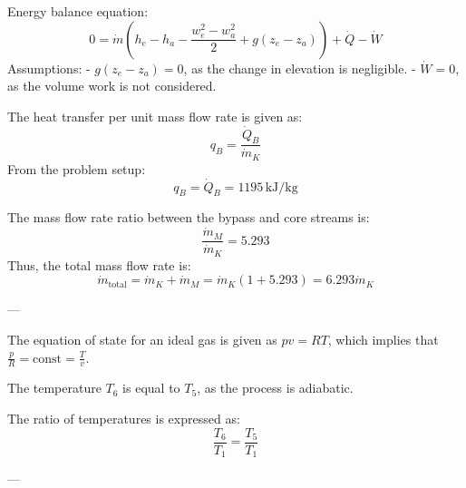 Energy balance equation:  
\[
0 = \dot{m} \left( h_e - h_a - \frac{w_e^2 - w_a^2}{2} + g(z_e - z_a) \right) + \dot{Q} - \dot{W}
\]  
Assumptions:  
- \( g(z_e - z_a) = 0 \), as the change in elevation is negligible.  
- \( \dot{W} = 0 \), as the volume work is not considered.  

The heat transfer per unit mass flow rate is given as:  
\[
q_B = \frac{\dot{Q}_B}{\dot{m}_K}
\]  
From the problem setup:  
\[
q_B = \dot{Q}_B = 1195 \, \text{kJ/kg}
\]  

The mass flow rate ratio between the bypass and core streams is:  
\[
\frac{\dot{m}_M}{\dot{m}_K} = 5.293
\]  
Thus, the total mass flow rate is:  
\[
\dot{m}_{\text{total}} = \dot{m}_K + \dot{m}_M = \dot{m}_K \left( 1 + 5.293 \right) = 6.293 \dot{m}_K
\]  

---

The equation of state for an ideal gas is given as \( p v = R T \), which implies that \( \frac{p}{R} = \text{const} = \frac{T}{v} \).  

The temperature \( T_6 \) is equal to \( T_5 \), as the process is adiabatic.  

The ratio of temperatures is expressed as:  
\[
\frac{T_6}{T_1} = \frac{T_5}{T_1}
\]

---